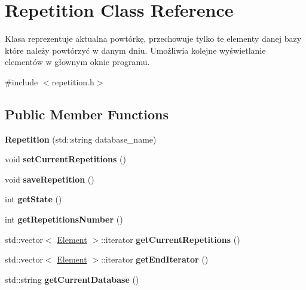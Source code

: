 \hypertarget{class_repetition}{}\section{Repetition Class Reference}
\label{class_repetition}


Klasa reprezentuje aktualna powtórkę, przechowuje tylko te elementy danej bazy które należy powtórzyć w danym dniu. Umożliwia kolejne wyświetlanie elementów w głownym oknie programu.  




{\ttfamily \#include $<$repetition.\+h$>$}

\subsection*{Public Member Functions}
\begin{DoxyCompactItemize}
\item 
\mbox{\label{class_repetition_a090f29e6791686f98f97d08aecd3e73f}} 
{\bfseries Repetition} (std\+::string database\+\_\+name)
\item 
\mbox{\label{class_repetition_ac4fc496f123f6889987b2fc1cc2cd6bc}} 
void {\bfseries set\+Current\+Repetitions} ()
\item 
\mbox{\label{class_repetition_ab0c80b930deaa082d58de162c94171ad}} 
void {\bfseries save\+Repetition} ()
\item 
\mbox{\label{class_repetition_ad7a38b006f3bea43c1e078c18696cd5a}} 
int {\bfseries get\+State} ()
\item 
\mbox{\label{class_repetition_a17b859f4c0018687e10c1a1f9fc73058}} 
int {\bfseries get\+Repetitions\+Number} ()
\item 
\mbox{\label{class_repetition_a61e44eaf56509396ab0f84f4a8b9dba6}} 
std\+::vector$<$ \mbox{\hyperlink{class_element}{Element}} $>$\+::iterator {\bfseries get\+Current\+Repetitions} ()
\item 
\mbox{\label{class_repetition_a6771c9a3a6800aa96ef3a1b57cc4f46b}} 
std\+::vector$<$ \mbox{\hyperlink{class_element}{Element}} $>$\+::iterator {\bfseries get\+End\+Iterator} ()
\item 
\mbox{\label{class_repetition_af6b10b986daed2831410200fafb44115}} 
std\+::string {\bfseries get\+Current\+Database} ()
\end{DoxyCompactItemize}



